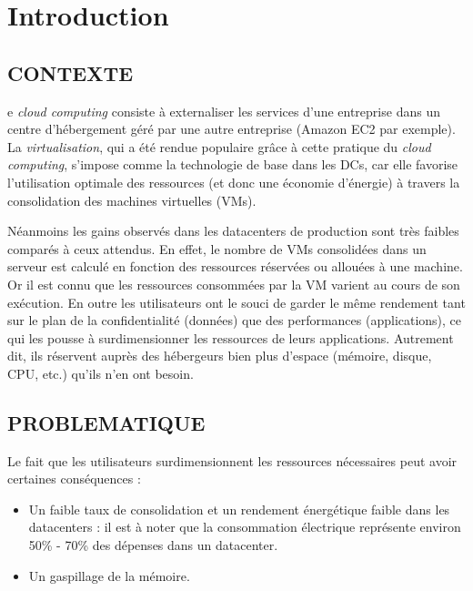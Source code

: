 %
%
\chapter*{Introduction}
\label{chap:intro}
\adjustmtc
\section*{CONTEXTE}

e \emph{cloud computing} consiste à externaliser les services d’une entreprise dans un centre d’hébergement géré par une autre entreprise (Amazon EC2 par exemple). La \emph{virtualisation}, qui a été rendue populaire grâce à cette pratique du \emph{cloud computing}, s'impose comme la technologie de base dans les \ac{DCs}, car elle favorise l'utilisation optimale des ressources (et donc une économie d'énergie) à travers la \break consolidation des machines virtuelles (\acs{VMs}).
\par\noindent Néanmoins les gains observés dans les datacenters de production sont très faibles comparés à ceux attendus. En effet, le nombre de VMs consolidées dans un serveur est calculé en fonction des ressources réservées ou allouées à une machine. Or il est connu que les ressources consommées par la VM varient au cours de son exécution. En outre les utilisateurs ont le souci de garder le même rendement tant sur le plan de la \break confidentialité (données) que des performances (applications), ce qui les pousse à surdimensionner les ressources de leurs applications. Autrement dit, ils réservent auprès des hébergeurs bien plus d'espace (mémoire, disque, CPU, etc.) qu'ils n'en ont besoin.

\section*{PROBLEMATIQUE}

Le fait que les utilisateurs surdimensionnent les ressources nécessaires peut avoir certaines conséquences :

\begin{itemize}[label=, font=\large \color{darkorange}]
    \item Un faible taux de consolidation et un rendement énergétique faible dans les datacenters :  il est à noter que la consommation électrique représente environ 50\% - 70\% des dépenses dans un datacenter\cite{energy_consumption}.
    \item Un gaspillage de la mémoire.
\end{itemize}


